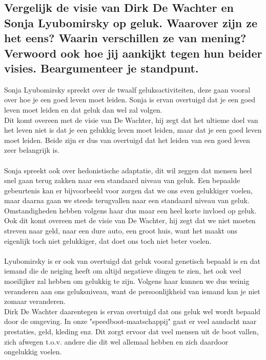 \documentclass[11pt,a4paper,titlepage]{article}
\begin{document}
\subsection{Vergelijk de visie van Dirk De Wachter en Sonja Lyubomirsky op geluk. Waarover zijn ze het eens? Waarin verschillen ze van mening? Verwoord ook hoe jij aankijkt tegen hun beider visies. Beargumenteer je standpunt. }
Sonja Lyubomirsky spreekt over de twaalf geluksactiviteiten, deze gaan vooral over hoe je een goed leven moet leiden. Sonja is ervan overtuigd dat je een goed leven moet leiden en dat geluk dan wel zal volgen.\\
Dit komt overeen met de visie van De Wachter, hij zegt dat het ultieme doel van het leven niet is dat je een gelukkig leven moet leiden, maar dat je een goed leven moet leiden. Beide zijn er dus van overtuigd dat het leiden van een goed leven zeer belangrijk is. \\ \\
Sonja spreekt ook over hedonistische adaptatie, dit wil zeggen dat mensen heel snel gaan terug zakken naar een standaard niveau van geluk. Een bepaalde gebeurtenis kan er bijvoorbeeld voor zorgen dat we ons even gelukkiger voelen, maar daarna gaan we steeds terugvallen naar een standaard niveau van geluk. Omstandigheden hebben volgens haar dus maar een heel korte invloed op geluk.\\
Ook dit komt overeen met de visie van De Wachter, hij zegt dat we niet moeten streven naar geld, naar een dure auto, een groot huis, want het maakt ons eigenlijk toch niet gelukkiger, dat doet ons toch niet beter voelen. \\ \\
Lyubomirsky is er ook van overtuigd dat geluk vooral genetisch bepaald is en dat iemand die de neiging heeft om altijd negatieve dingen te zien, het ook veel moeilijker zal hebben om gelukkig te zijn. Volgens haar kunnen we dus weinig veranderen aan ons geluksniveau, want de persoonlijkheid van iemand kan je niet zomaar veranderen.\\
Dirk De Wachter daarentegen is ervan overtuigd dat ons geluk wel wordt bepaald door de omgeving. In onze "speedboot-maatschappij"  gaat er veel aandacht naar prestaties, geld, kleding enz. Dit zorgt ervoor dat veel mensen uit de boot vallen, zich afwegen t.o.v. andere die dit wel allemaal hebben en zich daardoor ongelukkig voelen.
\end{document}
